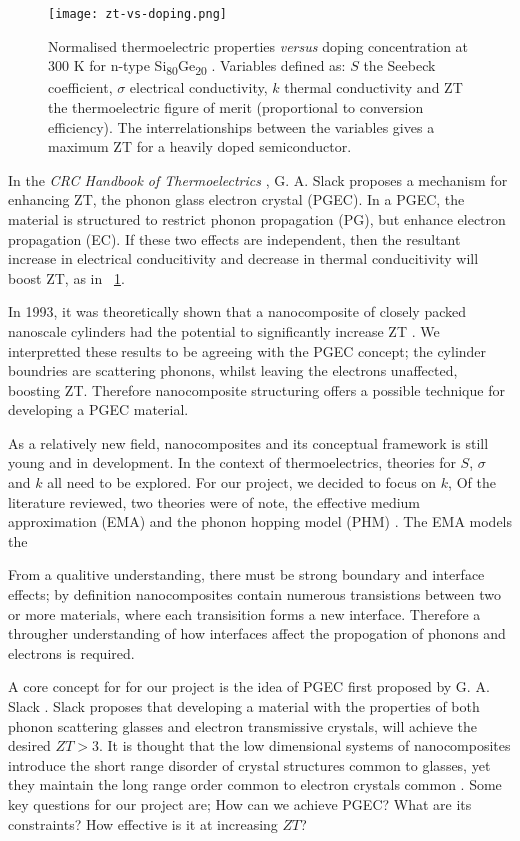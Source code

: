 \documentclass[12pt,draft]{article}
\newcommand{\figref}[2][\figurename~]{#1\ref{#2}}
\begin{document}
\begin{figure}
	\centering
	\texttt{[image: zt-vs-doping.png]}
	\caption{Normalised thermoelectric properties \emph{versus} doping concentration at 300 K for n-type Si\textsubscript{80}Ge\textsubscript{20} \cite{minnich-review}. Variables defined as: $S$ the Seebeck coefficient, $\sigma$ electrical conductivity, $k$ thermal conductivity and ZT the thermoelectric figure of merit (proportional to conversion efficiency). The interrelationships between the variables gives a maximum ZT for a heavily doped semiconductor.}
	\label{fig:zt-vs-doping}
\end{figure}

In the \emph{CRC Handbook of Thermoelectrics} \cite{crc-handbook}, G. A. Slack proposes a mechanism for enhancing ZT, the phonon glass electron crystal (PGEC). In a PGEC, the material is structured to restrict phonon propagation (PG), but enhance electron propagation (EC). If these two effects are independent, then the resultant increase in electrical conducitivity and decrease in thermal conducitivity will boost ZT, as in \figref{fig:zt-vs-doping}.

In 1993, it was theoretically shown that a nanocomposite of closely packed nanoscale cylinders had the potential to significantly increase ZT \cite{nanowires}. We interpretted these results to be agreeing with the PGEC concept; the cylinder boundries are scattering phonons, whilst leaving the electrons unaffected, boosting ZT. Therefore nanocomposite structuring offers a possible technique for developing a PGEC material.

As a relatively new field, nanocomposites and its conceptual framework is still young and in development. In the context of thermoelectrics, theories for $S$, $\sigma$ and $k$ all need to be explored. For our project, we decided to focus on $k$, Of the literature reviewed, two theories were of note, the effective medium approximation (EMA) \cite{ema} and the phonon hopping model (PHM) \cite{phm}. The EMA models the


From a qualitive understanding, there must be strong boundary and interface effects; by definition nanocomposites contain numerous transistions between two or more materials, where each transisition forms a new interface. Therefore a througher understanding of how interfaces affect the propogation of phonons and electrons is required.


A core concept for for our project is the idea of \ac{PGEC} first proposed by G. A. Slack \cite{crc-handbook}. Slack proposes that developing a material with the properties of both phonon scattering glasses and electron transmissive crystals, will achieve the desired $ZT > 3$. It is thought that the low dimensional systems of nanocomposites introduce the short range disorder of crystal structures common to glasses, yet they maintain the long range order common to electron crystals common \cite{crc-handbook}. Some key questions for our project are; How can we achieve \ac{PGEC}? What are its constraints? How effective is it at increasing $ZT$?
\end{document}
